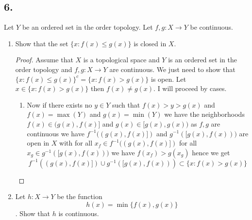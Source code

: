 \documentclass{amsart}
\theoremstyle{plain}
\theoremstyle{definition}
\theoremstyle{remark}
\begin{document}
\subsection*{6.} Let $Y$ be an ordered set in the order topology. Let $f,g:X\to Y$ be continuous.
\begin{enumerate}
    \item Show that the set $\{x: f(x)\leq g(x)\}$ is closed in $X$.
    \begin{proof}
        Assume that $X$ is a topological space and $Y$ is an ordered set in the order topology and $f,g:X\to Y$ are continuous. We just need to show that $\{x: f(x)\leq g(x)\}^c=\{x: f(x)> g(x)\}$ is open. Let $x\in \{x: f(x)> g(x)\}$ then $f(x)\not = g(x)$. I will proceed by cases. \begin{enumerate}
            \item Now if there exists no $y\in Y$ such that $f(x)>y>g(x)$ and $f(x)=\max(Y)$ and $g(x)=\min(Y)$ we have the neighborhoods $f(x)\in (g(x),f(x)]$ and $g(x)\in [g(x),g(x))$ as $f,g$ are continuous we have $f^{-1}((g(x),f(x)])$ and $g^{-1}([g(x),f(x)))$ are open in $X$ with for all $x_f\in  f^{-1}((g(x),f(x)])$ for all $x_g\in g^{-1}([g(x),f(x)))$ we have $f(x_f)>g(x_g)$ hence we get \[f^{-1}((g(x),f(x)])\cup g^{-1}([g(x),f(x))) \subset \{x: f(x)>g(x)\}\]
        \end{enumerate}
            
        
    \end{proof}


    \item Let $h:X\to Y$ be the function \[ h(x)=\min \{f(x),g(x)\}\]. Show that $h$ is continuous. 
\end{enumerate}

 
\end{document}
